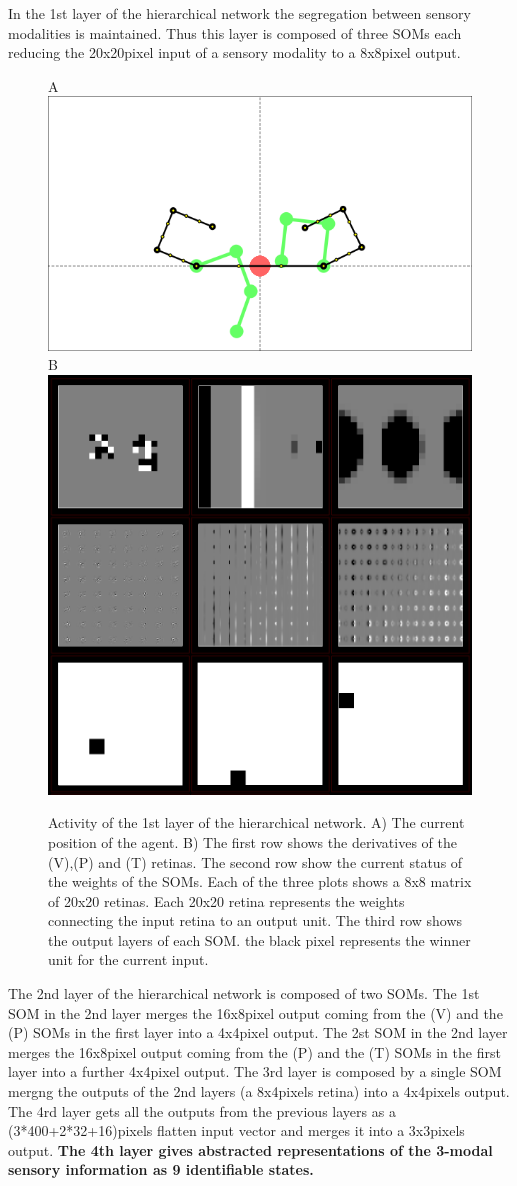 \documentclass[11pt]{article}
\begin{document}
In the 1st layer of the hierarchical network the segregation between sensory
modalities is maintained. Thus this layer is composed of three SOMs each
reducing the 20x20pixel input of a sensory modality to a 8x8pixel output.
%
\begin{figure}[H]
    \centering
    A \includegraphics[width=.6\textwidth]{SOMs_kinematics}\\
    B \includegraphics[width=.6\textwidth]{SOMs}

    \caption{
        Activity of the 1st layer of the hierarchical network. A) The
        current position of the agent. B) The first row shows the derivatives of
        the (V),(P) and (T) retinas. The second row show the current status of the 
        weights of the SOMs. Each of the three plots shows a 8x8 matrix of 
        20x20 retinas. Each 20x20 retina represents the weights connecting 
        the input retina to an output unit. The third row shows the output layers
        of each SOM. the black pixel represents the winner unit for the current input.
    }

    \label{fig:soms}
\end{figure}
%
The 2nd layer of the hierarchical network is composed of two SOMs. The 1st SOM in
the 2nd layer merges the 16x8pixel output coming from the (V) and the (P) SOMs
in the first layer into a 4x4pixel output. The 2st SOM in the 2nd layer merges
the 16x8pixel output coming from the (P) and the (T) SOMs in the first layer
into a further 4x4pixel output. The 3rd layer is composed by a single SOM
mergng the outputs of the 2nd layers (a 8x4pixels retina) into a 4x4pixels
output. The 4rd layer gets all the outputs from the previous layers as a
(3*400+2*32+16)pixels flatten input vector and merges it into a 3x3pixels
output. \textbf{The 4th layer gives abstracted representations of the 3-modal
    sensory information as 9 identifiable states.  }
\end{document}
